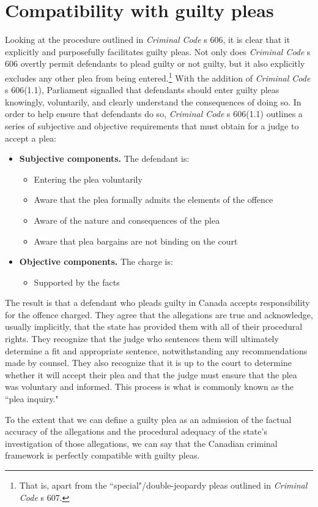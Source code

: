 \section{Compatibility with guilty pleas}

Looking at the procedure outlined in \textit{Criminal Code} s 606, it is clear that it explicitly and purposefully facilitates guilty pleas. Not only does \textit{Criminal Code} s 606 overtly permit defendants to plead guilty or not guilty, but it also explicitly excludes any other plea from being entered.\footnote{That is, apart from the ``special"/double-jeopardy pleas outlined in \textit{Criminal Code} s 607.} With the addition of \textit{Criminal Code} s 606(1.1), Parliament signalled that defendants should enter guilty pleas knowingly, voluntarily, and clearly understand the consequences of doing so. In order to help ensure that defendants do so, \textit{Criminal Code} s 606(1.1) outlines a series of subjective and objective requirements that must obtain for a judge to accept a plea:

\begin{itemize}
    \item \textbf{Subjective components.} The defendant is:
    \begin{itemize}
        \item Entering the plea voluntarily
        \item Aware that the plea formally admits the elements of the offence
        \item Aware of the nature and consequences of the plea
        \item Aware that plea bargains are not binding on the court
    \end{itemize}
    \item \textbf{Objective components.} The charge is:
    \begin{itemize}
        \item Supported by the facts
    \end{itemize}
\end{itemize}



The result is that a defendant who pleads guilty in Canada accepts responsibility for the offence charged. They agree that the allegations are true and acknowledge, usually implicitly, that the state has provided them with all of their procedural rights. They recognize that the judge who sentences them will ultimately determine a fit and appropriate sentence, notwithstanding any recommendations made by counsel. They also recognize that it is up to the court to determine whether it will accept their plea and that the judge must ensure that the plea was voluntary and informed. This process is what is commonly known as the ``plea inquiry." 



To the extent that we can define a guilty plea as an admission of the factual accuracy of the allegations and the procedural adequacy of the state's investigation of those allegations, we can say that the Canadian criminal framework is perfectly compatible with guilty pleas.